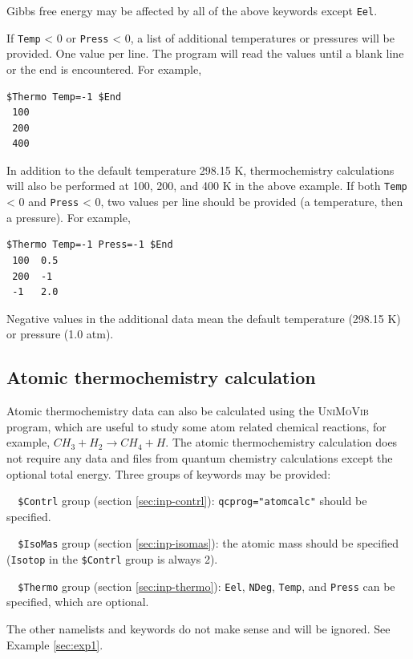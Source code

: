 \documentclass[12pt,english]{extarticle}
\begin{document}
Gibbs free energy may be affected by all of the above keywords except \verb|Eel|.

If \verb|Temp| < 0 or \verb|Press| < 0, a list of additional temperatures or pressures will be provided. One value per line. The program will
read the values until a blank line or the end is encountered.
For example,
\begin{Verbatim}[frame=single]
 $Thermo Temp=-1 $End
 100
 200
 400
\end{Verbatim}
In addition to the default temperature 298.15 K, thermochemistry calculations will also be performed at 100, 200, and 400 K in the above example. If both \verb|Temp| < 0 and \verb|Press| < 0, two values per line should be provided (a temperature, then a pressure). For example,
\begin{Verbatim}[frame=single]
 $Thermo Temp=-1 Press=-1 $End
 100  0.5
 200  -1
 -1   2.0
\end{Verbatim}
Negative values in the additional data mean the default temperature (298.15 K) or pressure (1.0 atm).

\subsection{Atomic thermochemistry calculation} \label{sec:inp-atom}

Atomic thermochemistry data can also be calculated using the \textsc{UniMoVib} program, which are useful to
study some atom related chemical reactions, for example, $CH_3 + H_2 \rightarrow CH_4 + H$. The atomic
thermochemistry calculation does not require any data and files from quantum chemistry calculations except the
optional total energy. Three groups of keywords may be provided:

\begin{description}
\item[ ]\verb|  $Contrl| group (section \ref{sec:inp-contrl}): \verb|qcprog="atomcalc"| should be specified.
\item[ ]\verb|  $IsoMas| group (section \ref{sec:inp-isomas}): the atomic mass should be specified (\verb|Isotop| in the \verb|$Contrl| group is always 2).
\item[ ]\verb|  $Thermo| group (section \ref{sec:inp-thermo}): \verb|Eel|, \verb|NDeg|, \verb|Temp|, and \verb|Press| can be specified, which are optional.
\end{description}
The other namelists and keywords do not make sense and will be ignored. See Example \ref{sec:exp1}.
\end{document}
